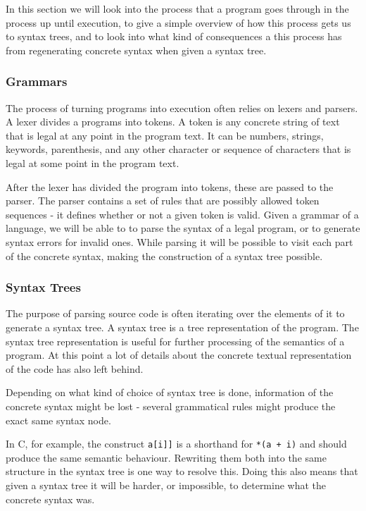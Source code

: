 \documentclass[11pt]{article}
\begin{document}
In this section we will look into the process that a program goes through in the process up until execution, to give a simple overview of how this process gets us to syntax trees, and to look into what kind of consequences a this process has from regenerating concrete syntax when given a syntax tree.

\subsubsection{Grammars}
The process of turning programs into execution often relies on lexers and parsers. A lexer divides a programs into tokens. A token is any concrete string of text that is legal at any point in the program text. It can be numbers, strings, keywords, parenthesis, and any other character or sequence of characters that is legal at some point in the program text. 

After the lexer has divided the program into tokens, these are passed to the parser. The parser contains a set of rules that are possibly allowed token sequences - it defines whether or not a given token is valid. Given a grammar of a language, we will be able to to parse the syntax of a legal program, or to generate syntax errors for invalid ones. While parsing it will be possible to visit each part of the concrete syntax, making the construction of a syntax tree possible.

\subsubsection{Syntax Trees}
The purpose of parsing source code is often iterating over the elements of it to generate a syntax tree. A syntax tree is a tree representation of the program. The syntax tree representation is useful for further processing of the semantics of a program. At this point a lot of details about the concrete textual representation of the code has also left behind.

Depending on what kind of choice of syntax tree is done, information of the concrete syntax might be lost - several grammatical rules might produce the exact same syntax node.

In C, for example, the construct \texttt{a[i]]} is a shorthand for \texttt{*(a + i)} and should produce the same semantic behaviour. Rewriting them both into the same structure in the syntax tree is one way to resolve this. Doing this also means that given a syntax tree it will be harder, or impossible, to determine what the concrete syntax was.
\end{document}
